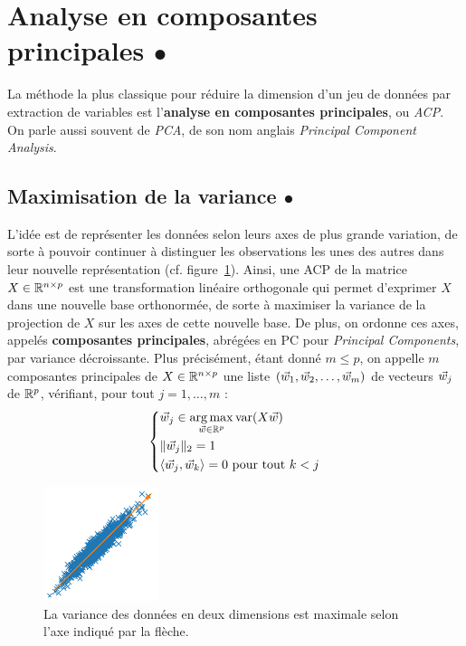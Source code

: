 
\section{Analyse en composantes principales $\bullet$}
\label{sec:pca}
La méthode la plus classique pour réduire la dimension d'un jeu de données par
extraction de variables est l'\textbf{analyse en composantes principales}, ou
{\it ACP}. On parle aussi souvent de {\it PCA}, de son nom anglais {\it
  Principal Component Analysis}.

\subsection{Maximisation de la variance $\bullet$}
\label{sec:variance_maximization}
L'idée est de représenter les données selon leurs axes de plus grande
variation, de sorte à pouvoir continuer à distinguer les observations les unes
des autres dans leur nouvelle représentation
(cf. figure~\ref{fig:data_variance}).  Ainsi, une ACP de la matrice
$X \in \mathbb{R}^{n \times p}$ est une transformation linéaire orthogonale qui permet d'exprimer
$X$ dans une nouvelle base orthonormée, de sorte à maximiser la variance de la
projection de $X$ sur les axes de cette nouvelle base. De plus, on ordonne ces
axes, appelés \textbf{composantes principales}, abrégées en {PC} pour {\it
  Principal Components}, par variance décroissante.
Plus précisément, étant donné $m \leq p$, on appelle $m$ composantes
principales de $X \in \mathbb{R}^{n \times p}$ une liste $(\ww_1, \ww_2, \ldots, \ww_m)$ de
vecteurs $\ww_j$ de $\mathbb{R}^p$, vérifiant, pour tout $j = 1, \dots, m$ :
\begin{equation}
  \left\lbrace
    \begin{split}
      & \ww_j \in \argmax_{\ww \in \RR^p} \text{var}(X \ww) \\
      & \ltwonorm{\ww_j} = 1 \\
      & \langle \ww_j, \ww_k \rangle = 0  \text{ pour tout } k < j
    \end{split}
  \right.
  \label{eq:pc_def}
\end{equation}
  


\begin{figure}[h!]
  \centering
  \includegraphics[width=0.3\textwidth]{figures/dimred/data_variance}
  \caption{La variance des données en deux dimensions est maximale selon l'axe
    indiqué par la flèche.}
  \label{fig:data_variance}
\end{figure}


